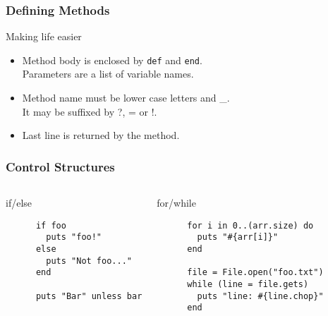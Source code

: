 \documentclass{beamer}
\begin{document}
\begin{frame}[fragile]
  \frametitle{Defining Methods}
  \begin{block}{Making life easier}
    \begin{semiverbatim}
    \end{semiverbatim}
    \begin{itemize}
      \item<2>Method body is enclosed by \texttt{def} and \texttt{end}. \\ Parameters are a list of variable names.
      \item<3>Method name must be lower case letters and \_. \\ It may be suffixed by ?, = or !.
      \item<4>Last line is returned by the method.
    \end{itemize}
  \end{block}
\end{frame}

\begin{frame}[fragile]
  \frametitle{Control Structures}
  \begin{columns}[t]
      \begin{block}{if/else}
        \begin{verbatim}
	  if foo
	    puts "foo!"
	  else
	    puts "Not foo..."
	  end

	  puts "Bar" unless bar
	\end{verbatim}
      \end{block}
      \begin{block}{for/while}
	\begin{verbatim}
	  for i in 0..(arr.size) do
	    puts "#{arr[i]}"
	  end

	  file = File.open("foo.txt")
	  while (line = file.gets)
	    puts "line: #{line.chop}"
	  end
	\end{verbatim}
      \end{block}
  \end{columns}
\end{frame}
\end{document}
